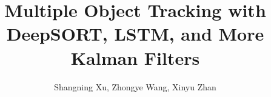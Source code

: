 \documentclass[conference]{IEEEtran}
\newcommand{\todo}[1]{\textcolor{red}{[TODO: #1]}}
\begin{document}
%
\title{Multiple Object Tracking with DeepSORT, LSTM, and More Kalman Filters}
%
%
%

\author{
    Shangning Xu,
    Zhongye Wang,
    Xinyu Zhan
}

%


\maketitle




\IEEEpeerreviewmaketitle

\end{document}
